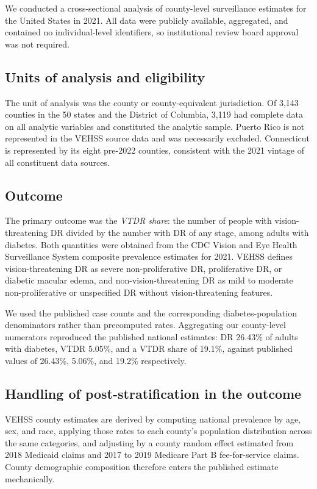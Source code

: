 \documentclass[11pt]{article}
\begin{document}
We conducted a cross-sectional analysis of county-level surveillance estimates
for the United States in 2021. All data were publicly available, aggregated, and
contained no individual-level identifiers, so institutional review board
approval was not required.

\subsection{Units of analysis and eligibility}

The unit of analysis was the county or county-equivalent jurisdiction. Of 3,143
counties in the 50 states and the District of Columbia, 3,119 had complete data
on all analytic variables and constituted the analytic sample. Puerto Rico is
not represented in the VEHSS source data and was necessarily excluded.
Connecticut is represented by its eight pre-2022 counties, consistent with the
2021 vintage of all constituent data sources.

\subsection{Outcome}

The primary outcome was the \emph{VTDR share}: the number of people with
vision-threatening DR divided by the number with DR of any stage, among adults
with diabetes. Both quantities were obtained from the CDC Vision and Eye Health
Surveillance System composite prevalence estimates for
2021.\citep{vehss,lundeen2023} VEHSS defines vision-threatening DR as severe
non-proliferative DR, proliferative DR, or diabetic macular edema, and
non-vision-threatening DR as mild to moderate non-proliferative or unspecified
DR without vision-threatening features.\citep{lundeen2023}

We used the published case counts and the corresponding diabetes-population
denominators rather than precomputed rates. Aggregating our county-level
numerators reproduced the published national estimates: DR 26.43\% of adults
with diabetes, VTDR 5.05\%, and a VTDR share of 19.1\%, against published values
of 26.43\%, 5.06\%, and 19.2\% respectively.

\subsection{Handling of post-stratification in the outcome}

VEHSS county estimates are derived by computing national prevalence by age, sex,
and race, applying those rates to each county's population distribution across
the same categories, and adjusting by a county random effect estimated from 2018
Medicaid claims and 2017 to 2019 Medicare Part B fee-for-service
claims.\citep{lundeen2023} County demographic composition therefore enters the
published estimate mechanically.
\end{document}
